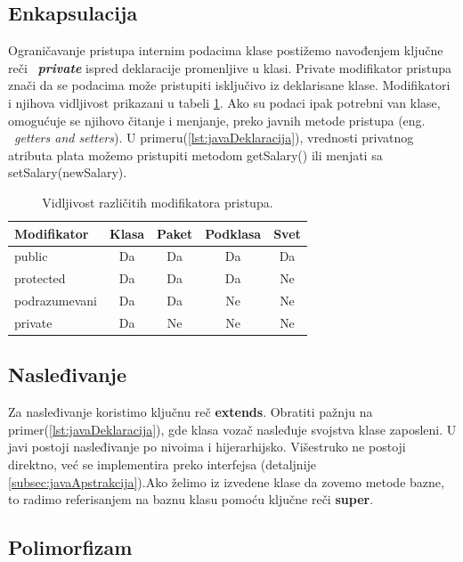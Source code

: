 \documentclass[a4paper]{article}
\begin{document}
\subsection{Enkapsulacija}
\label{subsec:javaEnkapsulacija}

Ograničavanje pristupa internim podacima klase postižemo navođenjem ključne reči ~{\em \textbf{private}} ispred deklaracije promenljive u klasi. Private modifikator pristupa znači da se podacima može pristupiti isključivo iz deklarisane klase. Modifikatori i njihova vidljivost prikazani u tabeli \ref{tab:tabelaModPristupa}. Ako su podaci ipak potrebni van klase, omogućuje se njihovo čitanje i menjanje, preko javnih metode pristupa (eng. ~{\em getters and setters})\cite{horstmann2017core}. U primeru(\ref{lst:javaDeklaracija}), vrednosti privatnog atributa plata možemo pristupiti metodom getSalary() ili menjati sa setSalary(newSalary).

\begin{table}[h!]
\begin{center}
\caption{Vidljivost različitih modifikatora pristupa.}
\begin{tabular}{|l|c|c|c|c|} \hline
Modifikator &Klasa &Paket &Podklasa &Svet\\ \hline
public &Da &Da &Da &Da\\ \hline
protected &Da &Da &Da &Ne\\ \hline
podrazumevani &Da &Da &Ne &Ne\\ \hline
private &Da &Ne &Ne &Ne\\ \hline
\end{tabular}
\label{tab:tabelaModPristupa}
\end{center}
\end{table}

\subsection{Nasleđivanje}
\label{subsec:javaNasledjivanje}

Za nasleđivanje koristimo ključnu reč \textbf{extends}. Obratiti pažnju na primer(\ref{lst:javaDeklaracija}), gde klasa vozač nasleđuje svojstva klase zaposleni. U javi postoji nasleđivanje po nivoima i hijerarhijsko. Višestruko ne postoji direktno\cite{oopJava}, već se implementira preko interfejsa (detaljnije \ref{subsec:javaApstrakcija}).Ako želimo iz izvedene klase da zovemo metode bazne, to radimo referisanjem na baznu klasu pomoću ključne reči \textbf{super}.

\subsection{Polimorfizam}
\label{subsec:javaPolimorfizam}
\end{document}
